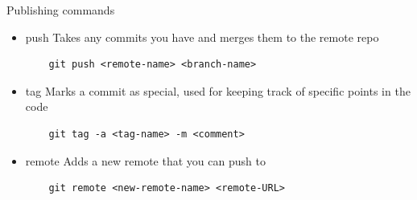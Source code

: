 \documentclass[t]{beamer}
\begin{document}
\begin{frame}[fragile]{Publishing commands}
\begin{itemize}
    \item push Takes any commits you have and merges them to the remote repo
    \begin{verbatim}
    git push <remote-name> <branch-name>
    \end{verbatim}
    \item tag Marks a commit as special, used for keeping track of specific points in the code
    \begin{verbatim}
    git tag -a <tag-name> -m <comment>
    \end{verbatim}
    \item remote Adds a new remote that you can push to
    \begin{verbatim}
    git remote <new-remote-name> <remote-URL>
    \end{verbatim}
    
\end{itemize}
    
\end{frame}
\end{document}
